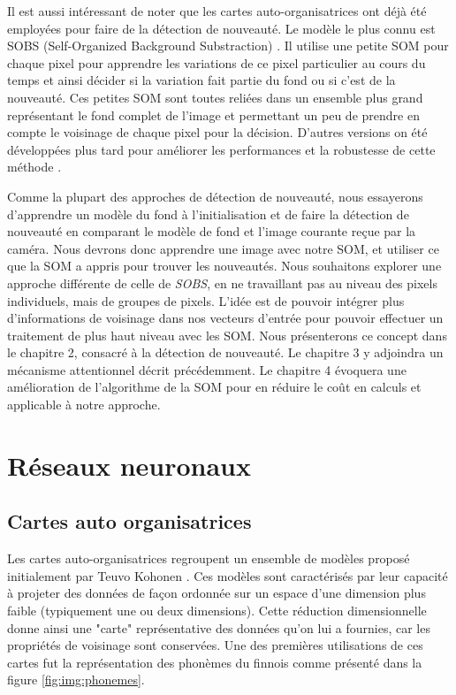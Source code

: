 	Il est aussi intéressant de noter que les cartes auto-organisatrices ont déjà été employées pour faire de la détection de nouveauté. Le modèle le plus connu est SOBS (Self-Organized Background Substraction) \cite{maddalena2008self}. Il utilise une petite SOM pour chaque pixel pour apprendre les variations de ce pixel particulier au cours du temps et ainsi décider si la variation fait partie du fond ou si c'est de la nouveauté. Ces petites SOM sont toutes reliées dans un ensemble plus grand représentant le fond complet de l'image et permettant un peu de prendre en compte le voisinage de chaque pixel pour la décision. D'autres versions on été développées plus tard pour améliorer les performances et la robustesse de cette méthode \cite{gemignani2016robust}.

	Comme la plupart des approches de détection de nouveauté, nous essayerons d'apprendre un modèle du fond à l'initialisation et de faire la détection de nouveauté en comparant le modèle de fond et l'image courante reçue par la caméra. Nous devrons donc apprendre une image avec notre SOM, et utiliser ce que la SOM a appris pour trouver les nouveautés. Nous souhaitons explorer une approche différente de celle de \textit{SOBS}, en ne travaillant pas au niveau des pixels individuels, mais de groupes de pixels. L'idée est de pouvoir intégrer plus d'informations de voisinage dans nos vecteurs d'entrée pour pouvoir effectuer un traitement de plus haut niveau avec les SOM. Nous présenterons ce concept dans le chapitre 2, consacré à la détection de nouveauté. Le chapitre 3 y adjoindra un mécanisme attentionnel décrit précédemment. Le chapitre 4 évoquera une amélioration de l'algorithme de la SOM pour en réduire le coût en calculs et applicable à notre approche.

\newpage
\section{Réseaux neuronaux}
\subsection{Cartes auto organisatrices}\label{sec:sota:som}

	Les cartes auto-organisatrices regroupent un ensemble de modèles proposé initialement par Teuvo Kohonen \cite{kohonen-som82}. Ces modèles sont caractérisés par leur capacité à projeter des données de façon ordonnée sur un espace d'une dimension plus faible (typiquement une ou deux dimensions). Cette réduction dimensionnelle donne ainsi une "carte" représentative des données qu'on lui a fournies, car les propriétés de voisinage sont conservées. Une des premières utilisations de ces cartes fut la représentation des phonèmes du finnois comme présenté dans la figure \ref{fig:img:phonemes}.

